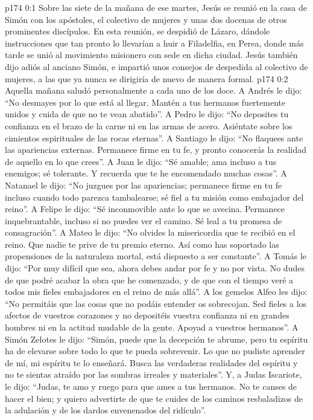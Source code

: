 \author{Comisión de seres intermedios}
\vs p174 0:1 Sobre las siete de la mañana de ese martes, Jesús se reunió en la casa de Simón con los apóstoles, el colectivo de mujeres y unas dos docenas de otros prominentes discípulos. En esta reunión, se despidió de Lázaro, dándole instrucciones que tan pronto lo llevarían a huir a Filadelfia, en Perea, donde más tarde se unió al movimiento misionero con sede en dicha ciudad. Jesús también dijo adiós al anciano Simón, e impartió unos consejos de despedida al colectivo de mujeres, a las que ya nunca se dirigiría de nuevo de manera formal.
\vs p174 0:2 Aquella mañana saludó personalmente a cada uno de los doce. A Andrés le dijo: “No desmayes por lo que está al llegar. Mantén a tus hermanos fuertemente unidos y cuida de que no te vean abatido”. A Pedro le dijo: “No deposites tu confianza en el brazo de la carne ni en las armas de acero. Asiéntate sobre los cimientos espirituales de las rocas eternas”. A Santiago le dijo: “No flaquees ante las apariencias externas. Permanece firme en tu fe, y pronto conocerás la realidad de aquello en lo que crees”. A Juan le dijo: “Sé amable; ama incluso a tus enemigos; sé tolerante. Y recuerda que te he encomendado muchas cosas”. A Natanael le dijo: “No juzgues por las apariencias; permanece firme en tu fe incluso cuando todo parezca tambalearse; sé fiel a tu misión como embajador del reino”. A Felipe le dijo: “Sé inconmovible ante lo que se avecina. Permanece inquebrantable, incluso si no puedes ver el camino. Sé leal a tu promesa de consagración”. A Mateo le dijo: “No olvides la misericordia que te recibió en el reino. Que nadie te prive de tu premio eterno. Así como has soportado las propensiones de la naturaleza mortal, está dispuesto a ser constante”. A Tomás le dijo: “Por muy difícil que sea, ahora debes andar por fe y no por vista. No dudes de que podré acabar la obra que he comenzado, y de que con el tiempo veré a todos mis fieles embajadores en el reino de más allá”. A los gemelos Alfeo les dijo: “No permitáis que las cosas que no podáis entender os sobrecojan. Sed fieles a los afectos de vuestros corazones y no depositéis vuestra confianza ni en grandes hombres ni en la actitud mudable de la gente. Apoyad a vuestros hermanos”. A Simón Zelotes le dijo: “Simón, puede que la decepción te abrume, pero tu espíritu ha de elevarse sobre todo lo que te pueda sobrevenir. Lo que no pudiste aprender de mí, mi espíritu te lo enseñará. Busca las verdaderas realidades del espíritu y no te sientas atraído por las sombras irreales y materiales”. Y, a Judas Iscariote, le dijo: “Judas, te amo y ruego para que ames a tus hermanos. No te canses de hacer el bien; y quiero advertirte de que te cuides de los caminos resbaladizos de la adulación y de los dardos envenenados del ridículo”.
